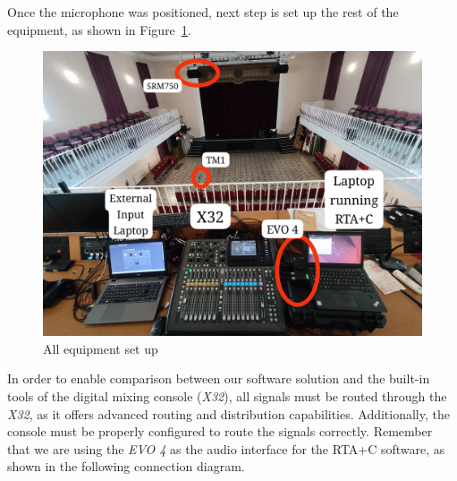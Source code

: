 Once the microphone was positioned, next step is set up the rest of the equipment, as shown in Figure~\ref{fig:Coro_setup}.

\begin{figure}[H]
	\centering
	\includegraphics[width=0.8
	\linewidth]{Figures/Coro_setup.jpeg}
	\caption{All equipment set up}
	\label{fig:Coro_setup}
\end{figure}

In order to enable comparison between our software solution and the built-in tools of the digital mixing console (\textit{X32}), all signals must be routed through the \textit{X32}, as it offers advanced routing and distribution capabilities. Additionally, the console must be properly configured to route the signals correctly. Remember that we are using the \textit{EVO 4} as the audio interface for the RTA+C software, as shown in the following connection diagram.

